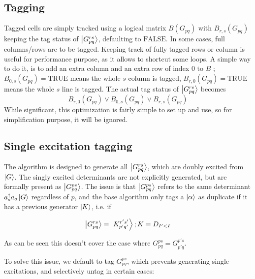 \documentclass[./thesis.tex]{subfiles}
\newcommand{\Gpqrs}{\ket{G^{rs}_{pq}}}
\begin{document}
\subsection{Tagging}

Tagged cells are simply tracked using a logical matrix $B(G_{pq})$ with $B_{r,s}(G_{pq})$ keeping the tag status of $\Gpqrs$, defaulting to $\text{FALSE}$. 
In some cases, full columns/rows are to be tagged. Keeping track of fully tagged rows or column is useful for performance purpose, as it allows to shortcut some loops. A simple way to do it, is to add an extra column and an extra row of index $0$ to $B$ ; $B_{0,s}(G_{pq}) = \text{TRUE}$ means the whole $s$ column is tagged, $B_{r,0}(G_{pq}) = \text{TRUE}$ means the whole $s$ line is tagged. The actual tag status of $\Gpqrs$ becomes
\begin{equation}
B_{r,0}(G_{pq}) \vee B_{0,s}(G_{pq}) \vee B_{r,s}(G_{pq})
\end{equation}
While significant, this optimization is fairly simple to set up and use, so for simplification purpose, it will be ignored.


\subsection{Single excitation tagging}
\label{single_tagging}
The algorithm is designed to generate all $\ket {G_{pq}^{rs}}$, which are doubly excited from $\ket G$. The singly excited determinants are not explicitly generated, but are formally present as $\ket{G_{pq}^{ps}}$.
The issue is that $\ket{G_{pq}^{ps}}$ refers to the same determinant $a^\dagger_s a_q \ket{G}$ regardless of $p$, and the base algorithm only tags a ${\ket{\alpha}}$ as duplicate if it has a previous generator $\ket K$, i.e. if

\begin{equation}
\ket {G_{pq}^{rs}} = \ket {K_{p'q'}^{r's'}} ; K = D_{I'<I}
\end{equation}

As can be seen this doesn't cover the case where $G_{pq}^{ps} = G_{p'q}^{p's}$.

To solve this issue, we default to tag $G_{pq}^{ps}$, which prevents generating single excitations, and selectively untag in certain cases:
\end{document}
